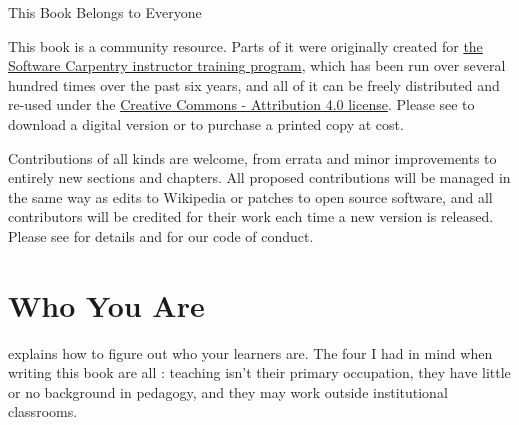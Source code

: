 \begin{callout}{This Book Belongs to Everyone}

  This book is a community resource.  Parts of it were originally
  created for
  \href{http://carpentries.github.io/instructor-training/}{the
    Software Carpentry instructor training program}, which has been
  run over several hundred times over the past six years, and all of
  it can be freely distributed and re-used under the
  \href{https://creativecommons.org/licenses/by/4.0/}{Creative Commons
    - Attribution 4.0 license}.  Please see {\website} to download a
  digital version or to purchase a printed copy at cost.

  Contributions of all kinds are welcome, from errata and minor
  improvements to entirely new sections and chapters.  All proposed
  contributions will be managed in the same way as edits to Wikipedia
  or patches to open source software, and all contributors will be
  credited for their work each time a new version is released.  Please
  see  for details and 
  for our code of conduct.

\end{callout}

\section{Who You Are}\label{s:intro-audience}

 explains how to figure out who your
learners are.  The four I had in mind when writing this book are all
: teaching isn't their
primary occupation, they have little or no background in pedagogy, and
they may work outside institutional classrooms.

